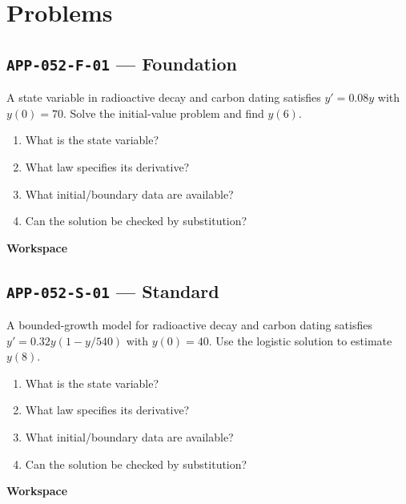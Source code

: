 \documentclass[11pt]{book}
\newcommand{\pid}[1]{\texttt{#1}}
\newcommand{\workspace}{\par\vspace{0.7in}\hrulefill\par\vspace{0.55in}\hrulefill\par}
\begin{document}
\section*{Problems}
\subsection*{\pid{APP-052-F-01} — Foundation}
\begin{problembox}
A state variable in radioactive decay and carbon dating satisfies $y'=0.08y$ with $y(0)=70$. Solve the initial-value problem and find $y(6)$.
\end{problembox}
\begin{promptbox}\begin{enumerate}
\item What is the state variable?
\item What law specifies its derivative?
\item What initial/boundary data are available?
\item Can the solution be checked by substitution?
\end{enumerate}\end{promptbox}
\textbf{Workspace}\workspace
{}
\subsection*{\pid{APP-052-S-01} — Standard}
\begin{problembox}
A bounded-growth model for radioactive decay and carbon dating satisfies $y'=0.32y(1-y/540)$ with $y(0)=40$. Use the logistic solution to estimate $y(8)$.
\end{problembox}
\begin{promptbox}\begin{enumerate}
\item What is the state variable?
\item What law specifies its derivative?
\item What initial/boundary data are available?
\item Can the solution be checked by substitution?
\end{enumerate}\end{promptbox}
\textbf{Workspace}\workspace
{}
\end{document}
